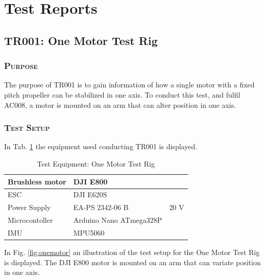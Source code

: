 \section{Test Reports}
\subsection{TR001: One Motor Test Rig}
         {}

\subsubsection*{\textsc{\medium Purpose}}
The purpose of TR001 is to gain information of how a single motor with a fixed pitch propeller can be stabilized in one axis. To conduct this test, and fulfil AC008, a motor is mounted on an arm that can alter position in one axis. 

\subsubsection*{\textsc{\medium Test Setup}}
In Tab. \ref{tab:tabt1} the equipment used conducting TR001 is displayed. 
\begin {table}[H]
    \begin{center}
    \caption {Test Equipment: One Motor Test Rig} 
    \label{tab:tabt1} 
    \begin{tabular}{|l|l|l|}\hline 
        Brushless motor    & DJI E800   &\\ \hline
        ESC         & DJI E620S     &\\ \hline
        Power Supply & EA-PS 2342-06 B  & 20 V   \\ \hline
        Microcontoller & Arduino Nano ATmega328P &\\ \hline
        IMU & MPU5060 & \\ \hline
    \end{tabular}
    \end{center}
\end{table}

\noindent
In Fig. \ref{fig:onemotor} an illustration of the test setup for the One Motor Test Rig is displayed. The DJI E800 motor is mounted on an arm that can variate position in one axis. 

